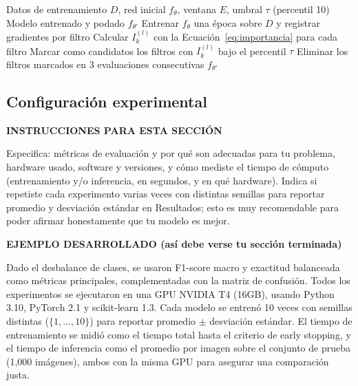 \documentclass[pdflatex,sn-mathphys-num]{sn-jnl}
\newenvironment{instruccion}{%
  \par\noindent\textbf{\color{blue!55!black}INSTRUCCIONES PARA ESTA SECCIÓN}%
  \par\vspace{2pt}\noindent\itshape\small
}{%
  \par\normalfont\vspace{6pt}
}
\newenvironment{ejemplo}{%
  \par\noindent\textbf{\color{green!35!black}EJEMPLO DESARROLLADO (así debe verse tu sección terminada)}%
  \par\vspace{2pt}\noindent\small
}{%
  \par\normalfont\vspace{6pt}
}
\begin{document}
\begin{algorithm}
\caption{Entrenamiento con poda dinámica de filtros}\label{alg:propuesto}
\begin{algorithmic}[1]
\Require Datos de entrenamiento $D$, red inicial $f_\theta$, ventana $E$, umbral $\tau$ (percentil 10)
\Ensure Modelo entrenado y podado $f_{\theta'}$
    \State Entrenar $f_\theta$ una época sobre $D$ y registrar gradientes por filtro
        \State Calcular $I^{(l)}_k$ con la Ecuación~\eqref{eq:importancia} para cada filtro
        \State Marcar como candidatos los filtros con $I^{(l)}_k$ bajo el percentil $\tau$
        \State Eliminar los filtros marcados en 3 evaluaciones consecutivas
    \EndIf
\EndFor
\State \Return $f_{\theta'}$
\end{algorithmic}
\end{algorithm}

\subsection{Configuración experimental}\label{subsec:config}

\begin{instruccion}
Especifica: métricas de evaluación y por qué son adecuadas para tu problema, hardware usado, software y versiones, y cómo mediste el tiempo de cómputo (entrenamiento y/o inferencia, en segundos, y en qué hardware). Indica si repetiste cada experimento varias veces con distintas semillas para reportar promedio y desviación estándar en Resultados; esto es muy recomendable para poder afirmar honestamente que tu modelo es mejor.
\end{instruccion}

\begin{ejemplo}
Dado el desbalance de clases, se usaron F1-score macro y exactitud balanceada como métricas principales, complementadas con la matriz de confusión. Todos los experimentos se ejecutaron en una GPU NVIDIA T4 (16GB), usando Python 3.10, PyTorch 2.1 y scikit-learn 1.3. Cada modelo se entrenó 10 veces con semillas distintas ($\{1, \dots, 10\}$) para reportar promedio $\pm$ desviación estándar. El tiempo de entrenamiento se midió como el tiempo total hasta el criterio de early stopping, y el tiempo de inferencia como el promedio por imagen sobre el conjunto de prueba (1{,}000 imágenes), ambos con la misma GPU para asegurar una comparación justa.
\end{ejemplo}
\end{document}
